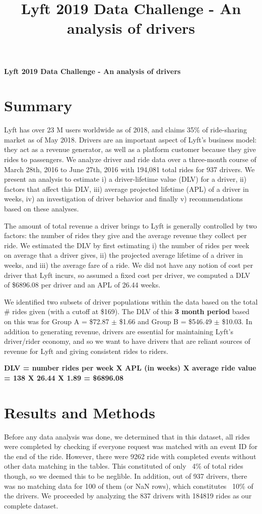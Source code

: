 \documentclass{report}
\title{Lyft 2019 Data Challenge - An analysis of drivers}
\begin{document}

\textbf{Lyft 2019 Data Challenge - An analysis of drivers}

\section{Summary}
	Lyft has over 23 M users worldwide as of 2018, and claims 35\% of ride-sharing market as of May 2018. Drivers are an important aspect of Lyft's business model: they act as a revenue generator, as well as a platform customer because they give rides to passengers. We analyze driver and ride data over a three-month course of March 28th, 2016 to June 27th, 2016 with 194,081 total rides for 937 drivers. We present an analysis to estimate i) a driver-lifetime value (DLV) for a driver, ii) factors that affect this DLV, iii) average projected lifetime (APL) of a driver in weeks, iv) an investigation of driver behavior and finally v) recommendations based on these analyses.

	The amount of total revenue a driver brings to Lyft is generally controlled by two factors: the number of rides they give and the average revenue they collect per ride. We estimated the DLV by first estimating i) the number of rides per week on average that a driver gives, ii) the projected average lifetime of a driver in weeks, and iii) the average fare of a ride. We did not have any notion of cost per driver that Lyft incurs, so assumed a fixed cost per driver, we computed a DLV of \$6896.08 per driver and an APL of 26.44 weeks.

	We identified two subsets of driver populations within the data based on the total \# rides given (with a cutoff at \$169). The DLV of this \textbf{3 month period} based on this was for Group A = \$72.87 $\pm$ \$1.66 and Group B = \$546.49 $\pm$ \$10.03. In addition to generating revenue, drivers are essential for maintaining Lyft's driver/rider economy, and so we want to have drivers that are reliant sources of revenue for Lyft and giving consistent rides to riders.

	\textbf{DLV = number rides per week X APL (in weeks) X average ride value = 138 X 26.44 X 1.89 = \$6896.08} 

\section{Results and Methods}
	Before any data analysis was done, we determined that in this dataset, all rides were completed by checking if everyone request was matched with an event ID for the end of the ride. However, there were 9262 ride with completed events without other data matching in the tables. This constituted of only ~4\% of total rides though, so we deemed this to be neglible. In addition, out of 937 drivers, there was no matching data for 100 of them (or NaN rows), which constitutes ~10\% of the drivers. We proceeded by analyzing the 837 drivers with 184819 rides as our complete dataset.
\end{document}
